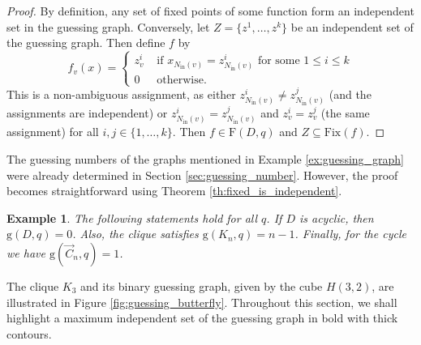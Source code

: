 \documentclass[a4paper, 11pt]{book}
\numberwithin{equation}{section}
\theoremstyle{plain}
\newtheorem{example}	[equation]	{Example}
\newcommand{\neighbourhood}{N}
\newcommand{\inn}[1]{#1_\mathrm{in}}
\newcommand{\NIn}{\inn{\neighbourhood}}
\newcommand{\functions}{\mathrm{F}}
\newcommand{\Fix}{\mathrm{Fix}}
\newcommand{\guessing}{\mathrm{g}}
\renewcommand{\(}{\ldbrack}
\renewcommand{\)}{\rdbrack}
\begin{document}
\begin{proof}
By definition, any set of fixed points of some function form an independent set in the guessing graph. Conversely, let $Z = \{z^1, \dots, z^k\}$ be an independent set of the guessing graph. Then define $f$ by
\[
f_v(x)=
\begin{cases}
z^i_v&\text{ if $x_{\NIn(v)} = z^i_{\NIn(v)}$ for some $1\le i\le k$}\\
0&\text{ otherwise.}
\end{cases}
\]
This is a non-ambiguous assignment, as either $z^i_{\NIn(v)} \ne z^j_{\NIn(v)}$ (and the assignments are independent) or $z^i_{\NIn(v)} = z^j_{\NIn(v)}$ and $z^i_v = z^j_v$ (the same assignment) for all $i,j \in \{1, \dots,k\}$. Then $f \in \functions(D,q)$ and $Z\subseteq \Fix(f)$. 
\end{proof}

The guessing numbers of the graphs mentioned in Example \ref{ex:guessing_graph} were already determined in Section \ref{sec:guessing_number}. However, the proof becomes straightforward using Theorem \ref{th:fixed_is_independent}.

\begin{example} \label{ex:g_from_guessing_graph}
The following statements hold for all $q$. If $D$ is acyclic, then $\guessing(D,q) = 0$. Also, the clique satisfies $\guessing(K_n, q) = n-1$. Finally, for the cycle we have $\guessing(\vec{C}_n, q) = 1$.
\end{example}

The clique $K_3$ and its binary guessing graph, given by the cube $H(3,2)$, are illustrated in Figure \ref{fig:guessing_butterfly}. Throughout this section, we shall highlight a maximum independent set of the guessing graph in bold with thick contours.
\end{document}
